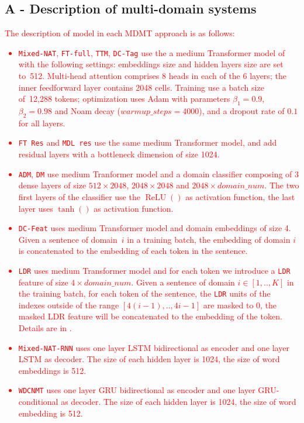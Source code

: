 \documentclass[11pt,a4paper]{article}
\newcommand{\fyTodo}[1]{\Todo[FY:]{\textcolor{orange}{#1}}}
\newcommand{\revision}[1]{\textcolor{red}{#1}}
\newcommand{\system}[1]{\texttt{{#1}}}
\begin{document}
\subsection*{A - Description of multi-domain systems \label{ssec:implementation-details}}
\revision{%
The description of model in each MDMT approach is as follows:
\begin{itemize}
\item \system{Mixed-NAT}, \system{FT-full}, \system{TTM}, \system{DC-Tag} use the a medium Transformer model of \cite{Vaswani17attention} with the following settings: embeddings size and hidden layers size are set to~512. Multi-head attention comprises 8 heads in each of the 6 layers; the inner feedforward layer contains 2048 cells. 
Training use a batch size of~12,288 tokens; optimization uses Adam with parameters $\beta_1=0.9$, $\beta_2= 0.98$ and Noam decay ($warmup\_steps=4000$), and a dropout rate of $0.1$ for all layers.
\item \system{FT Res} and \system{MDL res} use the same medium Transformer model, and add residual layers with a bottleneck dimension of size 1024.
\item \system{ADM}, \system{DM} use medium Tranformer model and a domain classifier composing of 3 dense layers of size $512 \times 2048$, $2048 \times 2048$ and $2048 \times domain\_num$. The two first layers of the classifier use the $\operatorname{ReLU}()$ as activation function, the last layer uses $\tanh()$ as activation function.
\item \system{DC-Feat} uses medium Transformer model and domain embeddings of size 4. Given a sentence of domain~$i$ in a training batch, the embedding of domain $i$ is concatenated to the embedding of each token in the sentence.
\item \system{LDR} uses medium Transformer model and for each token we introduce a \system{LDR} feature of size $4 \times domain\_num$. Given a sentence of domain $i\in[1,..,K]$ in the training batch, for each token of the sentence, the \system{LDR} units of the indexes outside of the range $[4(i-1),..,4i-1]$ are masked to 0, the masked LDR feature will be concatenated to the embedding of the token. Details are in \cite{Pham19generic}.
\item \system{Mixed-NAT-RNN} uses one layer LSTM bidirectional as encoder and one layer LSTM as decoder. The size of each hidden layer is 1024, the size of word embeddings is 512. 
\item \system{WDCNMT} uses one layer GRU bidirectional as encoder and one layer GRU-conditional as decoder. The size of each hidden layer is 1024, the size of word embedding is 512.
\end{itemize}
}
\end{document}
